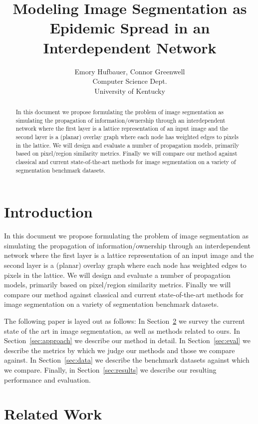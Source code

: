 \documentclass[twocolumn]{article}
\title{Modeling Image Segmentation as Epidemic Spread in an Interdependent Network}
\author{
  Emory Hufbauer, Connor Greenwell \\
  Computer Science Dept. \\
  University of Kentucky
}
\date{}
\newcommand{\secref}[1]{Section~\ref{sec:#1}}
\newcommand{\seclab}[1]{\label{sec:#1}}
\begin{document}
\maketitle

\begin{abstract}
In this document we propose formulating the problem of image segmentation as simulating the propagation of
information/ownership through an interdependent network where the first layer is a lattice representation of an input image
and the second layer is a (planar) overlay graph where each node has weighted edges to pixels in the lattice. We will design
and evaluate a number of propagation models, primarily based on pixel/region similarity metrics. Finally we will compare our
method against classical and current state-of-the-art methods for image segmentation on a variety of segmentation benchmark
datasets. 
\end{abstract}

\section{Introduction}

In this document we propose formulating the problem of image segmentation as simulating the propagation of
information/ownership through an interdependent network where the first layer is a lattice representation of an input image
and the second layer is a (planar) overlay graph where each node has weighted edges to pixels in the lattice. We will design
and evaluate a number of propagation models, primarily based on pixel/region similarity metrics. Finally we will compare our
method against classical and current state-of-the-art methods for image segmentation on a variety of segmentation benchmark
datasets. 

The following paper is layed out as follows: In \secref{related} we survey the current state of the art in image segmentation,
as well as methods related to ours. In \secref{approach} we describe our method in detail. In \secref{eval} we describe the
metrics by which we judge our methods and those we compare against. In \secref{data} we describe the benchmark datasets
against which we compare. Finally, in \secref{results} we describe our resulting performance and evaluation.

\section{Related Work}\seclab{related}
\end{document}
